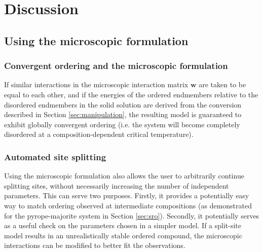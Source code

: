 \documentclass[preprint,12pt]{elsarticle}
\begin{document}
\section{Discussion}
\label{sec:discussion}

\subsection{Using the microscopic formulation}

\subsubsection{Convergent ordering and the microscopic formulation}

If similar interactions in the microscopic interaction matrix $\mathbf{w}$ are taken to be equal to each other, and if the energies of the ordered endmembers relative to the disordered endmembers in the solid solution are derived from the conversion described in Section \ref{sec:manipulation}, the resulting model is guaranteed to exhibit globally convergent ordering (i.e. the system will become completely disordered at a composition-dependent critical temperature). 


\subsubsection{Automated site splitting}

Using the microscopic formulation also allows the user to arbitrarily continue splitting sites, without necessarily increasing the number of independent parameters. This can serve two purposes. Firstly, it provides a potentially easy way to match ordering observed at intermediate compositions (as demonstrated for the pyrope-majorite system in Section \ref{sec:sro}). Secondly, it potentially serves as a useful check on the parameters chosen in a simpler model. If a split-site model results in an unrealistically stable ordered compound, the microscopic interactions can be modified to better fit the observations.

\end{document}
